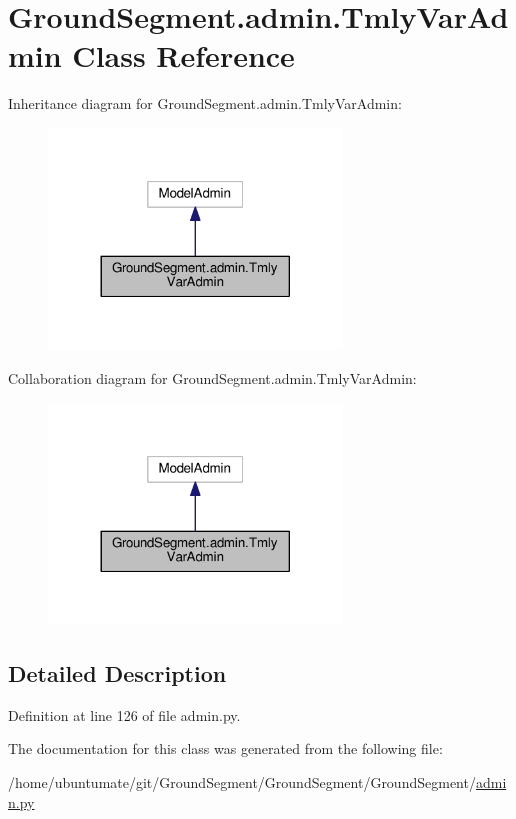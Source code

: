 \hypertarget{class_ground_segment_1_1admin_1_1_tmly_var_admin}{}\section{Ground\+Segment.\+admin.\+Tmly\+Var\+Admin Class Reference}
\label{class_ground_segment_1_1admin_1_1_tmly_var_admin}


Inheritance diagram for Ground\+Segment.\+admin.\+Tmly\+Var\+Admin\+:\nopagebreak
\begin{figure}[H]
\begin{center}
\leavevmode
\includegraphics[width=221pt]{class_ground_segment_1_1admin_1_1_tmly_var_admin__inherit__graph}
\end{center}
\end{figure}


Collaboration diagram for Ground\+Segment.\+admin.\+Tmly\+Var\+Admin\+:\nopagebreak
\begin{figure}[H]
\begin{center}
\leavevmode
\includegraphics[width=221pt]{class_ground_segment_1_1admin_1_1_tmly_var_admin__coll__graph}
\end{center}
\end{figure}


\subsection{Detailed Description}


Definition at line 126 of file admin.\+py.



The documentation for this class was generated from the following file\+:\begin{DoxyCompactItemize}
\item 
/home/ubuntumate/git/\+Ground\+Segment/\+Ground\+Segment/\+Ground\+Segment/\hyperlink{admin_8py}{admin.\+py}\end{DoxyCompactItemize}

